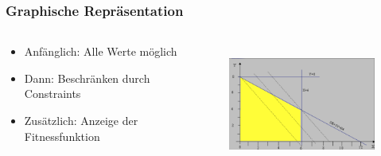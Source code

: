 \documentclass{beamer}
\begin{document}
  \begin{frame}
    \frametitle{Graphische Repräsentation}
    \begin{columns}[onlytextwidth]
      \begin{column}{0.4\textwidth}
        \begin{itemize}[<+->]
          \item Anfänglich: Alle Werte möglich
          \item Dann: Beschränken durch Constraints
          \item Zusätzlich: Anzeige der Fitnessfunktion
        \end{itemize}
      \end{column}
      \begin{column}{0.6\textwidth}
        \begin{figure}
          \centering
          \includegraphics[width=\linewidth,height=150px,keepaspectratio]{optimization_graphic.png}
        \end{figure}
      \end{column}
    \end{columns}
  \end{frame}
\end{document}

